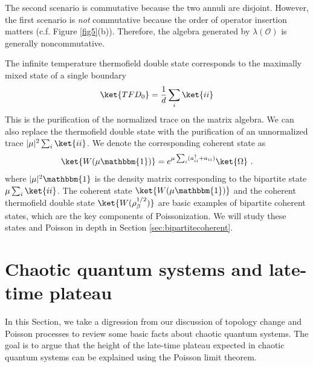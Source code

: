 \documentclass[a4paper,11pt]{article}
\theoremstyle{definition}
\numberwithin{equation}{section}
\begin{document}
The second scenario is commutative because the two annuli are disjoint. However, the first scenario is \textit{not} commutative because the order of operator insertion matters (c.f. Figure \ref{fig5}(b)). Therefore, the algebra generated by $\lambda(\mathcal{O})$ is generally noncommutative. 

The infinite temperature thermofield double state corresponds to the maximally mixed state of a single boundary
\begin{eqnarray}
    \ket{TFD_0} = \frac{1}{d}\sum_i\ket{ii}
\end{eqnarray}
This is the purification of the normalized trace on the matrix algebra. We can also replace the thermofield double state with the purification of an unnormalized trace $|\mu|^2\sum_i\ket{ii}$. We denote the corresponding coherent state as
\begin{eqnarray}
    \ket{W(\mu\mathbbm{1})}=e^{\mu\sum_i (a_{ii}^\dagger+a_{ii})}\ket{\Omega}\ .
\end{eqnarray}
where $|\mu|^2\mathbbm{1}$ is the density matrix corresponding to the bipartite state $\mu\sum_i\ket{ii}$. The coherent state $\ket{W(\mu\mathbbm{1})}$ and the coherent thermofield double state $\ket{W(\rho_\beta^{1/2})}$ are basic examples of bipartite coherent states, which are the key components of Poissonization. We will study these states and Poisson in depth in Section \ref{sec:bipartitecoherent}.


\section{Chaotic quantum systems and late-time plateau}\label{sec:chaoticsystems}
In this Section, we take a digression from our discussion of topology change and Poisson processes to review some basic facts about chaotic quantum systems. The goal is to argue that the height of the late-time plateau expected in chaotic quantum systems can be explained using the Poisson limit theorem.
\end{document}
